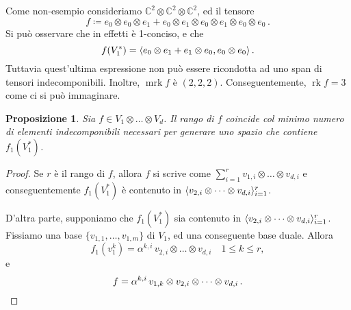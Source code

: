 \documentclass[a4paper, 11pt]{article}
\theoremstyle{definition}
\theoremstyle{plain}
\newtheorem{Prop}[Def]{Proposizione}
\DeclarePairedDelimiter{\ang}{\langle}{\rangle}
\newcommand{\C}{\mathbb{C}}
\newcommand{\deff}{\coloneqq}
\DeclareMathOperator{\rk}{rk}
\DeclareMathOperator{\mrk}{mrk}
\begin{document}
Come non-esempio consideriamo $\C^2 \otimes \C^2 \otimes \C^2$, ed il tensore
\[
	f \deff e_0 \otimes e_0 \otimes e_1 + e_0 \otimes e_1 \otimes e_0 \otimes e_1 \otimes e_0 \otimes e_0 \,.
\]
Si può osservare che in effetti è 1-conciso, e che 
\[
	f(V_1^\ast) = \ang{e_0\otimes e_1 + e_1 \otimes e_0, e_0 \otimes e_0}\,.
\]
Tuttavia quest'ultima espressione non può essere ricondotta ad uno span di tensori indecomponibili. Inoltre, $\mrk f$ è $(2,2,2)$. Conseguentemente, $\rk f = 3$ come ci si può immaginare.

\begin{Prop}
	Sia $f \in V_1 \otimes\dots\otimes 	V_d$. Il rango di $f$ coincide col minimo numero di elementi indecomponibili necessari per generare uno spazio che contiene $f_1(V_1^\ast)$.
\end{Prop}
\begin{proof}
	Se $r$ è il rango di $f$, allora $f$ si scrive come $\sum_{i = 1}^r v_{1,i}\otimes \dots \otimes v_{d,i}$ e conseguentemente $f_1(V_1^\ast)$ è contenuto in $\ang{v_{2,i}\otimes\dots\otimes v_{d,i}}_{i=1}^r$.
	
	D'altra parte, supponiamo che $f_1(V_1^*)$ sia contenuto in $\ang{v_{2,i}\otimes\dots\otimes v_{d,i}}_{i=1}^r$. Fissiamo una base $\{v_{1,1}, \dots, v_{1,m}\}$ di $V_1$, ed una conseguente base duale. Allora
	\[
		f_1(v_1^k) = \alpha^{k,i}\,v_{2,i}\otimes\dots\otimes v_{d,i}\quad 1\le k\le r,
	\]
	e 
	\[
		f = \alpha^{k,i}\,v_{1,k}\otimes v_{2,i}\otimes\dots\otimes v_{d,i}\,.\qedhere
	\]
\end{proof}
\end{document}
